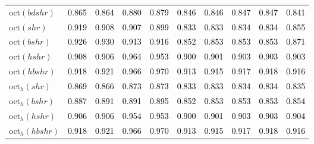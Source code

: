 \begin{tabular}[t]{>{\centering\arraybackslash}m{2.5cm}ccccccccc}
oct$(bdshr)$ & \textcolor{black}{0.865} & \textcolor{black}{0.864} & \textcolor{black}{0.880} & \textcolor{black}{0.879} & \textcolor{black}{0.846} & \textcolor{black}{0.846} & \textcolor{black}{0.847} & \textcolor{black}{0.847} & \textcolor{black}{0.841}\\
oct$(shr)$ & \textcolor{black}{0.919} & \textcolor{black}{0.908} & \textcolor{black}{0.907} & \textcolor{black}{0.899} & \textcolor{black}{0.833} & \textcolor{black}{0.833} & \textcolor{black}{0.834} & \textcolor{black}{0.834} & \textcolor{black}{0.855}\\
oct$(bshr)$ & \textcolor{black}{0.926} & \textcolor{black}{0.930} & \textcolor{black}{0.913} & \textcolor{black}{0.916} & \textcolor{black}{0.852} & \textcolor{black}{0.853} & \textcolor{black}{0.853} & \textcolor{black}{0.853} & \textcolor{black}{0.871}\\
oct$(hshr)$ & \textcolor{black}{0.908} & \textcolor{black}{0.906} & \textcolor{black}{0.964} & \textcolor{black}{0.953} & \textcolor{black}{0.900} & \textcolor{black}{0.901} & \textcolor{black}{0.903} & \textcolor{black}{0.903} & \textcolor{black}{0.903}\\
oct$(hbshr)$ & \textcolor{black}{0.918} & \textcolor{black}{0.921} & \textcolor{black}{0.966} & \textcolor{black}{0.970} & \textcolor{black}{0.913} & \textcolor{black}{0.915} & \textcolor{black}{0.917} & \textcolor{black}{0.918} & \textcolor{black}{0.916}\\
oct$_h(shr)$ & \textcolor{black}{0.869} & \textcolor{black}{0.866} & \textcolor{black}{0.873} & \textcolor{black}{0.873} & \textcolor{black}{0.833} & \textcolor{black}{0.833} & \textcolor{black}{0.834} & \textcolor{black}{0.834} & \textcolor{black}{0.835}\\
oct$_h(bshr)$ & \textcolor{black}{0.887} & \textcolor{black}{0.891} & \textcolor{black}{0.891} & \textcolor{black}{0.895} & \textcolor{black}{0.852} & \textcolor{black}{0.853} & \textcolor{black}{0.853} & \textcolor{black}{0.853} & \textcolor{black}{0.854}\\
oct$_h(hshr)$ & \textcolor{black}{0.906} & \textcolor{black}{0.906} & \textcolor{black}{0.954} & \textcolor{black}{0.953} & \textcolor{black}{0.900} & \textcolor{black}{0.901} & \textcolor{black}{0.903} & \textcolor{black}{0.903} & \textcolor{black}{0.904}\\
oct$_h(hbshr)$ & \textcolor{black}{0.918} & \textcolor{black}{0.921} & \textcolor{black}{0.966} & \textcolor{black}{0.970} & \textcolor{black}{0.913} & \textcolor{black}{0.915} & \textcolor{black}{0.917} & \textcolor{black}{0.918} & \textcolor{black}{0.916}\\
\bottomrule
\end{tabular}

